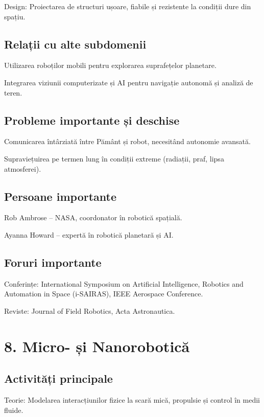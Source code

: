 \documentclass[12pt]{article}
\begin{document}
Design:
Proiectarea de structuri ușoare, fiabile și rezistente la condiții dure din spațiu.

\subsection*{Relații cu alte subdomenii}

Utilizarea roboților mobili pentru explorarea suprafețelor planetare.

Integrarea viziunii computerizate și AI pentru navigație autonomă și analiză de teren.

\subsection*{Probleme importante și deschise}

Comunicarea întârziată între Pământ și robot, necesitând autonomie avansată.

Supraviețuirea pe termen lung în condiții extreme (radiații, praf, lipsa atmosferei).

\subsection*{Persoane importante}

Rob Ambrose – NASA, coordonator în robotică spațială.

Ayanna Howard – expertă în robotică planetară și AI.

\subsection*{Foruri importante}

Conferințe: International Symposium on Artificial Intelligence, Robotics and Automation in Space (i-SAIRAS), IEEE Aerospace Conference.

Reviste: Journal of Field Robotics, Acta Astronautica.

\section{8. Micro- și Nanorobotică}

\subsection*{Activități principale}

Teorie:
Modelarea interacțiunilor fizice la scară mică, propulsie și control în medii fluide.
\end{document}

